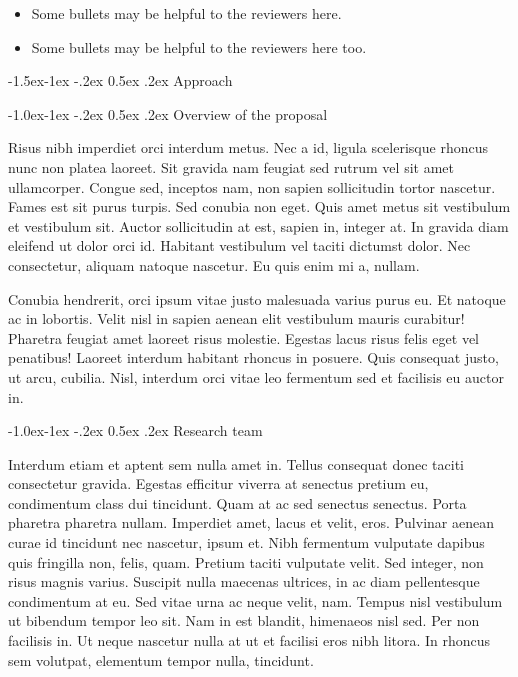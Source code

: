 \documentclass[11pt,]{article}
\makeatletter
\providecommand{\tightlist}{%
  \setlength{\itemsep}{0pt}\setlength{\parskip}{0pt}}
\renewcommand\subsection{
  \@startsection{subsection}{2}{\z@}
    {-1.5ex\@plus -1ex \@minus -.2ex}%
    {0.5ex \@plus .2ex}%
    {\normalfont\normalsize\bf}} %
\renewcommand\subsubsection{
  \@startsection{subsubsection}{3}{\z@}
    {-1.0ex\@plus -1ex \@minus -.2ex}%
    {0.5ex \@plus .2ex}%
    {\normalfont\normalsize\bf}} %
\makeatother
\begin{document}
\begin{itemize}
\tightlist
\item
  Some bullets may be helpful to the reviewers here.
\item
  Some bullets may be helpful to the reviewers here too.
\end{itemize}

\hypertarget{approach}{%
\subsection{Approach}\label{approach}}

\hypertarget{overview-of-the-proposal}{%
\subsubsection{Overview of the
proposal}\label{overview-of-the-proposal}}

Risus nibh imperdiet orci interdum metus. Nec a id, ligula scelerisque
rhoncus nunc non platea laoreet. Sit gravida nam feugiat sed rutrum vel
sit amet ullamcorper. Congue sed, inceptos nam, non sapien sollicitudin
tortor nascetur. Fames est sit purus turpis. Sed conubia non eget. Quis
amet metus sit vestibulum et vestibulum sit. Auctor sollicitudin at est,
sapien in, integer at. In gravida diam eleifend ut dolor orci id.
Habitant vestibulum vel taciti dictumst dolor. Nec consectetur, aliquam
natoque nascetur. Eu quis enim mi a, nullam.

Conubia hendrerit, orci ipsum vitae justo malesuada varius purus eu. Et
natoque ac in lobortis. Velit nisl in sapien aenean elit vestibulum
mauris curabitur! Pharetra feugiat amet laoreet risus molestie. Egestas
lacus risus felis eget vel penatibus! Laoreet interdum habitant rhoncus
in posuere. Quis consequat justo, ut arcu, cubilia. Nisl, interdum orci
vitae leo fermentum sed et facilisis eu auctor in.

\hypertarget{research-team}{%
\subsubsection{Research team}\label{research-team}}

Interdum etiam et aptent sem nulla amet in. Tellus consequat donec
taciti consectetur gravida. Egestas efficitur viverra at senectus
pretium eu, condimentum class dui tincidunt. Quam at ac sed senectus
senectus. Porta pharetra pharetra nullam. Imperdiet amet, lacus et
velit, eros. Pulvinar aenean curae id tincidunt nec nascetur, ipsum et.
Nibh fermentum vulputate dapibus quis fringilla non, felis, quam.
Pretium taciti vulputate velit. Sed integer, non risus magnis varius.
Suscipit nulla maecenas ultrices, in ac diam pellentesque condimentum at
eu. Sed vitae urna ac neque velit, nam. Tempus nisl vestibulum ut
bibendum tempor leo sit. Nam in est blandit, himenaeos nisl sed. Per non
facilisis in. Ut neque nascetur nulla at ut et facilisi eros nibh
litora. In rhoncus sem volutpat, elementum tempor nulla, tincidunt.
\end{document}
